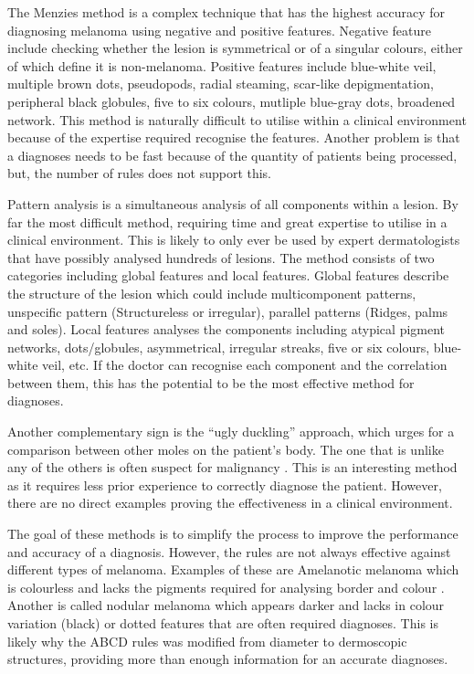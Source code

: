 The Menzies method is a complex technique that has the highest accuracy\cite{Carrera2016} for diagnosing melanoma using negative and positive features. Negative feature include checking whether the lesion is symmetrical or of a singular colours, either of which define it is non-melanoma. Positive features include blue-white veil, multiple brown dots, pseudopods, radial steaming, scar-like depigmentation, peripheral black globules, five to six colours, mutliple blue-gray dots, broadened network. This method is naturally difficult to utilise within a clinical environment because of the expertise required recognise the features. Another problem is that a diagnoses needs to be fast because of the quantity of patients being processed, but, the number of rules does not support this.

Pattern analysis is a simultaneous analysis of all components within a lesion. By far the most difficult method, requiring time and great expertise to utilise in a clinical environment. This is likely to only ever be used by expert dermatologists that have possibly analysed hundreds of lesions. The method consists of two categories including global features and local features. Global features describe the structure of the lesion which could include multicomponent patterns, unspecific pattern (Structureless or irregular), parallel patterns (Ridges, palms and soles). Local features analyses the components including atypical pigment networks, dots/globules, asymmetrical, irregular streaks, five or six colours, blue-white veil, etc. If the doctor can recognise each component and the correlation between them, this has the potential to be the most effective method for diagnoses.

Another complementary sign is the “ugly duckling” approach, which urges for a comparison between other moles on the patient’s body. The one that is unlike any of the others is often suspect for malignancy \cite{Jensen2015}. This is an interesting method as it requires less prior experience to correctly diagnose the patient. However, there are no direct examples proving the effectiveness in a clinical environment.

The goal of these methods is to simplify the process to improve the performance and accuracy of a diagnosis. However, the rules are not always effective against different types of melanoma. Examples of these are Amelanotic melanoma which is colourless and lacks the pigments required for analysing border and colour \cite{Pizzichetta2004}. Another is called nodular melanoma which appears darker and lacks in colour variation (black) or dotted features that are often required diagnoses. This is likely why the ABCD rules was modified from diameter to dermoscopic structures, providing more than enough information for an accurate diagnoses.


